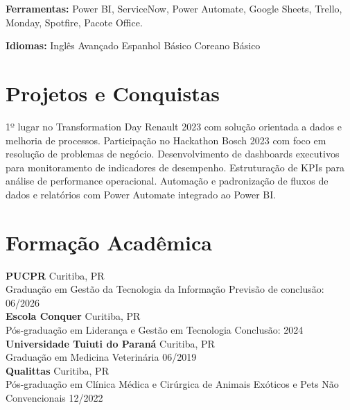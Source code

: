 \documentclass[11pt,a4paper]{article}
\begin{document}
\textbf{Ferramentas:} Power BI, ServiceNow, Power Automate, Google Sheets, Trello, Monday, Spotfire, Pacote Office.

\textbf{Idiomas:} Inglês Avançado \enspace\textbullet\enspace Espanhol Básico \enspace\textbullet\enspace Coreano Básico

\section{Projetos e Conquistas}

1º lugar no Transformation Day Renault 2023 com solução orientada a dados e melhoria de processos. Participação no Hackathon Bosch 2023 com foco em resolução de problemas de negócio. Desenvolvimento de dashboards executivos para monitoramento de indicadores de desempenho. Estruturação de KPIs para análise de performance operacional. Automação e padronização de fluxos de dados e relatórios com Power Automate integrado ao Power BI.

\section{Formação Acadêmica}

\textbf{PUCPR} \hfill Curitiba, PR\\
Graduação em Gestão da Tecnologia da Informação \hfill Previsão de conclusão: 06/2026\\[6pt]

\textbf{Escola Conquer} \hfill Curitiba, PR\\
Pós-graduação em Liderança e Gestão em Tecnologia \hfill Conclusão: 2024\\[6pt]

\textbf{Universidade Tuiuti do Paraná} \hfill Curitiba, PR\\
Graduação em Medicina Veterinária \hfill 06/2019\\[6pt]

\textbf{Qualittas} \hfill Curitiba, PR\\
Pós-graduação em Clínica Médica e Cirúrgica de Animais Exóticos e Pets Não Convencionais \hfill 12/2022
\end{document}
